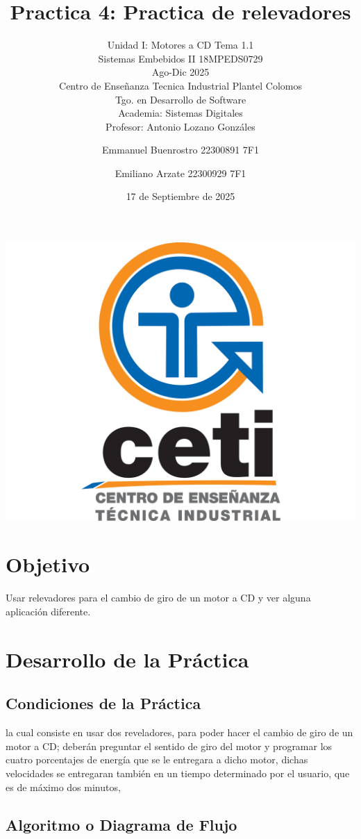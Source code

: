 \documentclass[11pt]{scrartcl}
\title {Practica 4: Practica de relevadores}
\subtitle{Unidad I: Motores a CD Tema 1.1 \\ Sistemas Embebidos II 18MPEDS0729 \\ Ago-Dic 2025 \\ Centro de Enseñanza Tecnica Industrial Plantel Colomos\\Tgo. en Desarrollo de Software \\ Academia: Sistemas Digitales \\Profesor: Antonio Lozano Gonzáles }
\date{17 de Septiembre de 2025}
\author{Emmanuel Buenrostro 22300891 7F1 \\ \and Emiliano Arzate 22300929 7F1 \\}
\begin{document}
\maketitle
\begin{center}
   \includegraphics[scale=0.15]{../../cetilogo.jpg} 
\end{center}
\newpage

\section{Objetivo}

 Usar relevadores para el cambio de giro de un motor a CD y ver alguna aplicación diferente.
\section{Desarrollo de la Práctica}

\subsection{Condiciones de la Práctica}
la cual consiste en usar dos reveladores, para
poder hacer el cambio de giro de un motor a CD; deberán preguntar el
sentido de giro del motor y programar los cuatro porcentajes de energía
que se le entregara a dicho motor, dichas velocidades se entregaran
también en un tiempo determinado por el usuario, que es de máximo dos
minutos, 


\subsection{Algoritmo o Diagrama de Flujo}
\end{document}
